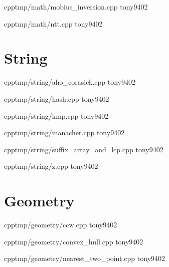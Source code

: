 {}
{}
{}
{cpp}{tmp/math/mobius_inversion.cpp}
{tony9402}



{}
{}
{}
{cpp}{tmp/math/ntt.cpp}
{tony9402}


\section{String}


{}
{}
{}
{cpp}{tmp/string/aho_corasick.cpp}
{tony9402}



{}
{}
{}
{cpp}{tmp/string/hash.cpp}
{tony9402}



{}
{}
{}
{cpp}{tmp/string/kmp.cpp}
{tony9402}



{}
{}
{}
{cpp}{tmp/string/manacher.cpp}
{tony9402}



{}
{}
{}
{cpp}{tmp/string/suffix_array_and_lcp.cpp}
{tony9402}



{}
{}
{}
{cpp}{tmp/string/z.cpp}
{tony9402}


\section{Geometry}


{}
{}
{}
{cpp}{tmp/geometry/ccw.cpp}
{tony9402}



{}
{}
{}
{cpp}{tmp/geometry/convex_hull.cpp}
{tony9402}



{}
{}
{}
{cpp}{tmp/geometry/nearest_two_point.cpp}
{tony9402}
